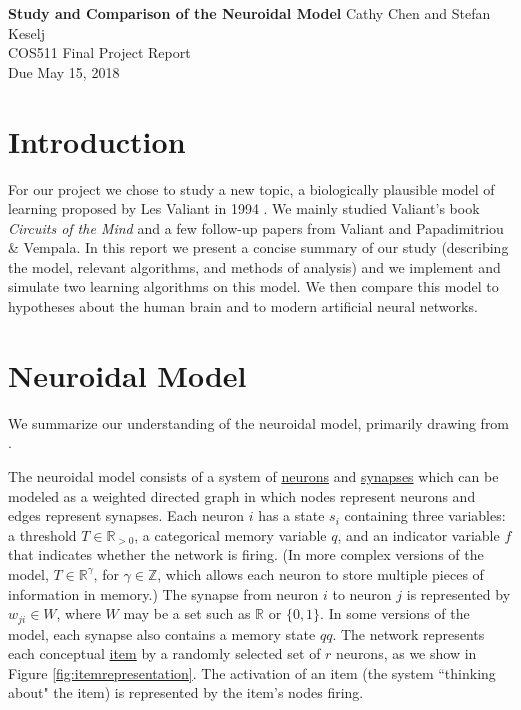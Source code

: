 \documentclass[letterpaper, 12pt]{article}
\begin{document}
\noindent
\textbf{Study and Comparison of the Neuroidal Model} \hfill \newline Cathy Chen and Stefan Keselj \\
COS511 Final Project Report \\
Due May 15, 2018

\section{Introduction}
For our project we chose to study a new topic, a biologically plausible model of learning proposed by Les Valiant in 1994 \cite{valiant_circuits_1994}. We mainly studied Valiant's book \textit{Circuits of the Mind} and a few follow-up papers from Valiant and Papadimitriou \& Vempala. In this report we present a concise summary of our study (describing the model, relevant algorithms, and methods of analysis) and we implement and simulate two learning algorithms on this model. We then compare this model to hypotheses about the human brain and to modern artificial neural networks.

\section{Neuroidal Model}\label{sec:model}
We summarize our understanding of the neuroidal model, primarily drawing from \cite{valiant_circuits_1994, valiant_memorization_2005, papadimitriou_cortical_2015}.

The neuroidal model consists of a system of \underline{neurons} and \underline{synapses} which can be modeled as a weighted directed graph in which nodes represent neurons and edges represent synapses. Each neuron $i$ has a state $s_i$ containing three variables: a threshold $T\in\mathbb{R}_{>0}$, a categorical memory variable $q$, and an indicator variable $f$ that indicates whether the network is firing. (In more complex versions of the model, $T\in\mathbb{R}^\gamma$, for $\gamma\in\mathbb{Z}$, which allows each neuron to store multiple pieces of information in memory.) The synapse from neuron $i$ to neuron $j$ is represented by $w_{ji}\in W$, where $W$ may be a set such as $\mathbb{R}$ or $\{0,1\}$. In some versions of the model, each synapse also contains a memory state $qq$. The network represents each conceptual \underline{item} by a randomly selected set of $r$ neurons, as we show in Figure \ref{fig:itemrepresentation}. The activation of an item (the system ``thinking about" the item) is represented by the item's nodes firing.
\end{document}
